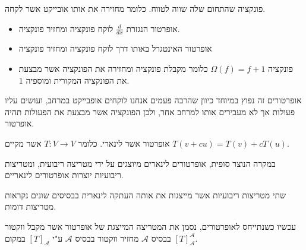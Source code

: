 \documentclass{tstextbook}
\begin{document}
\begin{definition}[אופרטור]
פונקציה שהתחום שלה שווה לטווח. כלומר מחזירה את אותו אובייקט אשר לקחה.

\end{definition}
\begin{example}
  \begin{itemize}
    \item אופרטור הנגזרת \(\frac{d}{dx}\) לוקח פונקציה ומחזיר פונקציה.
    \item אופרטור האינטגרל באותו דרך לוקח פונקציה ומחזיר פונקציה
    \item פונקציה \(\Omega(f)=f+1\) כלומר מקבלת פונקציה ומחזירה את הפונקציה אשר מבצעת את הפונקציה המקורית ומוספיה 1.
  \end{itemize}
\end{example}
\begin{remark}
אופרטורים זה נפוץ במיוחד כיוון שהרבה פעמים אנחנו לוקחים אופבייקט במרחב, ועושים עליו פעולות אך לא מעבירים אותו למרחב אחר, ולכן הפונקציה אשר מבצעת את הפעולות תהיה אופרטור.

\end{remark}
\begin{definition}
אופרטור אשר לינארי. כלומר \(T:V\to V\) אשר מקיים \(T(v+cu)=T(v)+cT(u)\).

\end{definition}
\begin{proposition}
במקרה הנוצר סופית, אופרטורים לינארים מיוצגים על ידי מטריצה ריבועית, ומטריצות ריבועיות יוצרות אופרטורים לינאריים.

\end{proposition}
\begin{definition}
שתי מטריצות ריבועיות אשר מייצגות את אותה העתקה לינארית בבסיסים שונים נקראות מטריצות דומות.

\end{definition}
\begin{symbolize}
עכשיו כשנתייחס לאופרטורים, נסמן את המטריצה המייצגת של אופרטור אשר מקבל ווקטור בבסיס \(\mathcal{A}\) מחזיר ווקטור בבסיס \(\mathcal{A}\) ע"י \([T]_{\mathcal{A}}\) במקום \([T]_{\mathcal{A}}^{\mathcal{A}}\).

\end{symbolize}
\end{document}
